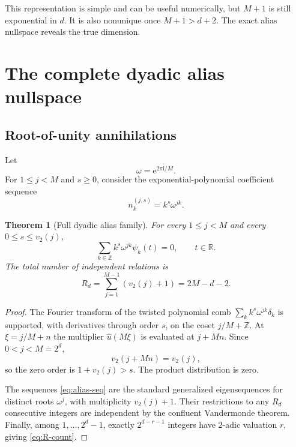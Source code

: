 \documentclass[11pt,oneside]{article}
\newtheorem{theorem}{Theorem}[section]
\theoremstyle{definition}
\theoremstyle{remark}
\newcommand{\R}{\mathbb R}
\newcommand{\Z}{\mathbb Z}
\newcommand{\e}{\mathrm e}
\newcommand{\ii}{\mathrm i}
\newcommand{\vtwo}{v_2}
\begin{document}
This representation is simple and can be useful numerically, but $M+1$ is still exponential in $d$.  It is also nonunique once $M+1>d+2$.  The exact alias nullspace reveals the true dimension.

\section{The complete dyadic alias nullspace}
\label{sec:alias-nullspace}

\subsection{Root-of-unity annihilations}
Let
\begin{equation}
 \omega=\e^{2\pi\ii/M}.                                   \label{eq:omega}
\end{equation}
For $1\le j<M$ and $s\ge0$, consider the exponential-polynomial coefficient sequence
\begin{equation}
 n_k^{(j,s)}=k^s\omega^{jk}.                               \label{eq:alias-seq}
\end{equation}

\begin{theorem}[Full dyadic alias family]
\label{thm:alias-family}
For every $1\le j<M$ and every $0\le s\le\vtwo(j)$,
\begin{equation}
 \sum_{k\in\Z}k^s\omega^{jk}\psi_k(t)=0,
 \qquad t\in\R.                                          \label{eq:alias-zero}
\end{equation}
The total number of independent relations is
\begin{equation}
 R_d=\sum_{j=1}^{M-1}(\vtwo(j)+1)=2M-d-2.                 \label{eq:R-count}
\end{equation}
\end{theorem}

\begin{proof}
The Fourier transform of the twisted polynomial comb
\(
 \sum_k k^s\omega^{jk}\delta_k
\)
is supported, with derivatives through order $s$, on the coset $j/M+\Z$.  At $\xi=j/M+n$ the multiplier $\widehat u(M\xi)$ is evaluated at $j+Mn$.  Since $0<j<M=2^d$,
\begin{equation}
 \vtwo(j+Mn)=\vtwo(j),                                    \label{eq:v2-coset}
\end{equation}
so the zero order is $1+\vtwo(j)>s$.  The product distribution is zero.

The sequences \eqref{eq:alias-seq} are the standard generalized eigensequences for distinct roots $\omega^j$, with multiplicity $\vtwo(j)+1$.  Their restrictions to any $R_d$ consecutive integers are independent by the confluent Vandermonde theorem.  Finally, among $1,\ldots,2^d-1$, exactly $2^{d-r-1}$ integers have $2$-adic valuation $r$, giving \eqref{eq:R-count}.
\end{proof}
\end{document}

